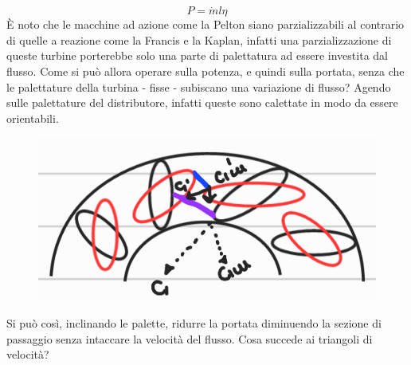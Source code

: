 \documentclass[a4paper, 15pt]{article}
\begin{document}
\begin{adjustwidth}{2in}{}
	\[P = \dot{m}l\eta\]
	È noto che le macchine ad azione come la Pelton siano parzializzabili al contrario di quelle a reazione come la Francis e la Kaplan, infatti una parzializzazione di queste turbine porterebbe solo una parte di palettatura ad essere investita dal flusso. 	
	Come si può allora operare sulla potenza, e quindi sulla portata, senza che le palettature della turbina - fisse - subiscano una variazione di flusso? Agendo sulle palettature del distributore, infatti queste sono calettate in modo da essere orientabili. 	
\begin{figure}[H]
	\centering
	\includegraphics[width=0.3\linewidth]{immagini/turbinafrancis4}
	\label{fig:turbinafrancis4}
\end{figure}
	Si può così, inclinando le palette, ridurre la portata diminuendo la sezione di passaggio senza intaccare la velocità del flusso. 
\newpage	
	Cosa succede ai triangoli di velocità? 
	


\end{adjustwidth}
\end{document}
